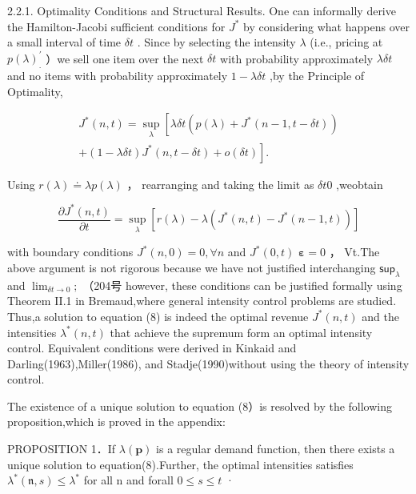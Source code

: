 2.2.1. Optimality Conditions and Structural Results. One can informally
derive the Hamilton-Jacobi sufficient conditions for \(J ^ { * }\) by
considering what happens over a small interval of time \(\delta t\) .
Since by selecting the intensity \(\lambda\) (i.e., pricing at
\(p ( \lambda ) _ { . } ^ { \prime }\) ）we sell one item over the next
\(\delta t\) with probability approximately \(\lambda \delta t\) and no
items with probability approximately \(1 - \lambda \delta t\) ,by the
Principle of Optimality,

\[
\begin{array} { r } { J ^ { * } ( n , t ) = \underset { \lambda } { \operatorname* { s u p } } \left[ \lambda \delta t ( p ( \lambda ) + J ^ { * } ( n - 1 , t - \delta t ) ) \right. } \\ { \left. + ( 1 - \lambda \delta t ) J ^ { * } ( n , t - \delta t ) + o ( \delta t ) \right] . } \end{array}
\]

Using \(r ( \lambda ) \doteq \lambda p ( \lambda )\) ， rearranging and
taking the limit as \(\delta t  0\) ,weobtain

\[
\frac { \partial J ^ { * } ( n , t ) } { \partial t } = \operatorname* { s u p } _ { \lambda } \left[ r ( \lambda ) - \lambda ( J ^ { * } ( n , t ) - J ^ { * } ( n - 1 , t ) ) \right]
\]

with boundary conditions \(J ^ { * } ( n , 0 ) = 0 , \forall n\) and
\(J ^ { * } ( 0 , t )\) \(\mathbf { \varepsilon } = 0\) ， Vt.The above
argument is not rigorous because we have not justified interchanging
\(\mathsf { s u p } _ { \lambda }\) and
\(\scriptstyle \operatorname* { l i m } _ { \delta t \to 0 } ;\) （204号
however, these conditions can be justified formally using Theorem II.1
in Bremaud,where general intensity control problems are studied. Thus,a
solution to equation (8) is indeed the optimal revenue
\(J ^ { * } ( n , t )\) and the intensities
\(\lambda ^ { * } ( n , t )\) that achieve the supremum form an optimal
intensity control. Equivalent conditions were derived in Kinkaid and
Darling(1963),Miller(1986), and Stadje(1990)without using the theory of
intensity control.

The existence of a unique solution to equation (8）is resolved by the
following proposition,which is proved in the appendix:

PROPOSITION 1．If \(\lambda ( \boldsymbol { p } )\) is a regular demand
function, then there exists a unique solution to equation(8).Further,
the optimal intensities satisfies
\(\lambda ^ { * } ( \mathfrak { n } , s ) \leq \lambda ^ { * }\) for all
n and forall \(0 \leq s \leq t\) ·

